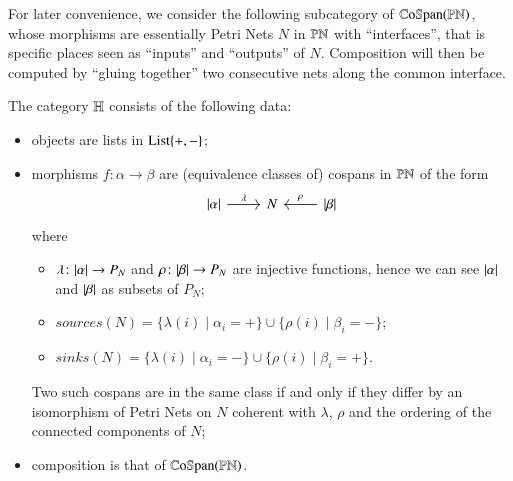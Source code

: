 For later convenience, we consider the following subcategory of $\mathbb{C}\mathrm{o}\mathbb{S}\mathrm{pan}(\mathbb{PN})$, whose morphisms are essentially Petri Nets $N$ in $\mathbb{PN}$ with ``interfaces'', that is specific places seen as ``inputs'' and ``outputs'' of $N$. Composition will then be computed by ``gluing together'' two consecutive nets along the common interface.

\begin{definition}\label{definition:graph category}
    The category $\mathbb H$ consists of the following data:
    \begin{itemize}
        \item objects are lists in $\mathrm{List}\{+,-\}$;
        \item morphisms $f \colon \alpha \to \beta$ are (equivalence classes of) cospans in $\mathbb{PN}$ of the form
        \[
        \begin{tikzcd}
        \length\alpha \ar[r,"\lambda"] & N & \ar[l,"\rho"'] \length\beta
        \end{tikzcd}
        \]
        where 
        \begin{itemize}[leftmargin=*]
        \item $\lambda \colon \lvert \alpha \rvert \to P_N$ and $\rho \colon \lvert \beta \rvert \to P_N$ are injective functions, hence we can see $\lvert \alpha \rvert$ and $\lvert \beta \rvert$ as subsets of $P_N$; 
        \item $\mathit{sources}(N) = \{ \lambda(i) \mid \alpha_i=+ \} \cup \{ \rho(i) \mid \beta_i = - \}$;
        \item $\mathit{sinks}(N) = \{ \lambda(i) \mid \alpha_i=- \} \cup \{ \rho(i) \mid \beta_i = + \}$.
        \end{itemize}
        Two such cospans are in the same class if and only if they differ by an isomorphism of Petri Nets on $N$ coherent with $\lambda$, $\rho$ and the ordering of the connected components of $N$; 
        \item composition is that of $\mathbb{C}\mathrm{o}\mathbb{S}\mathrm{pan}(\mathbb{PN})$. 
    \end{itemize}
\end{definition}

